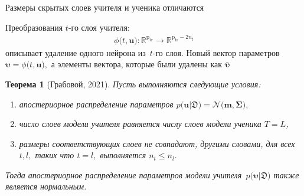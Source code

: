 \documentclass[10pt,pdf,hyperref={unicode}]{beamer}
\newtheorem{rustheorem}{Теорема}
\begin{document}
\begin{frame}{Размеры скрытых слоев учителя и ученика отличаются}

Преобразования $t$-го слоя учителя:
\[
\begin{aligned}
\phi\bigr(t, \textbf{u}\bigr) : \mathbb{R}^{\text{p}_{\text{tr}}} \to \mathbb{R}^{\text{p}_{\text{tr}}-2n_t}
\end{aligned}
\]
описывает удаление одного нейрона из~$t$-го слоя. Новый вектор параметров $\bm{\upsilon} =  \phi\bigr(t, \textbf{u}\bigr),$ а элементы вектора, которые были удалены как $\bar{\bm{\upsilon}}$

\begin{rustheorem}[Грабовой, 2021]
Пусть выполняются следующие условия:
\begin{enumerate}[1)]
\item апостериорное распределение параметров $p\bigr(\textbf{u}|\mathfrak{D}\bigr) = \mathcal{N}\bigr(\textbf{m}, \bm{\Sigma}\bigr),$
\item число слоев модели учителя равняется числу слоев модели ученика $T=L$,
\item размеры соответствующих слоев не совпадают, другими словами, для всех $t, l,$ таких что $t=l,$ выполняется $n_t \leq n_l.$
\end{enumerate}
Тогда апостериорное распределение параметров модели учителя~$p\bigr(\bm{\upsilon}|\mathfrak{D}\bigr)$ также является нормальным.
\end{rustheorem}

\end{frame}
\end{document}
